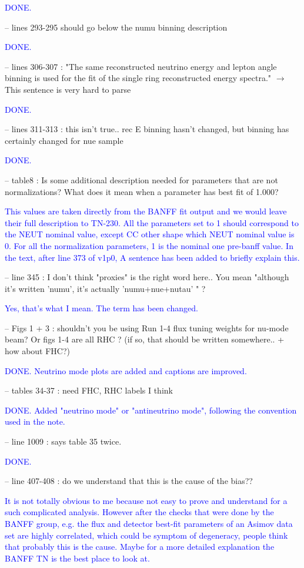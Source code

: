 \documentclass[final]{elsarticle}
\begin{document}
\textcolor{blue}{DONE.}


-- lines 293-295 should go below the numu binning description

\textcolor{blue}{DONE.}

-- lines 306-307 : "The same reconstructed neutrino energy and lepton angle
binning is used for the fit of the single ring reconstructed energy spectra."
$\rightarrow$ This sentence is very hard to parse

\textcolor{blue}{DONE.}

-- lines 311-313 : this isn't true.. rec E binning hasn't changed, but binning
has certainly changed for nue sample

\textcolor{blue}{DONE.}

-- table8 : Is some additional description needed for parameters that are not
normalizations?  What does it mean when a parameter has best fit of 1.000?

\textcolor{blue}{This values are taken directly from the BANFF fit output and we would leave their full description to TN-230.
All the parameters set to 1 should correspond to the NEUT nominal value,
except CC other shape which NEUT nominal value is 0.
For all the normalization parameters, 1 is the nominal one pre-banff value.
In the text, after line 373 of v1p0, A sentence has been added to briefly explain this.}


-- line 345 : I don't think "proxies" is the right word here.. You mean
"although it's written 'numu', it's actually 'numu+nue+nutau' " ?

\textcolor{blue}{Yes, that's what I mean. The term has been changed.}


-- Figs 1 + 3 : shouldn't you be using Run 1-4 flux tuning weights for nu-mode
beam?  Or figs 1-4 are all RHC ?  (if so, that should be written somewhere.. +
how about FHC?)

\textcolor{blue}{DONE. Neutrino mode plots are added and captions are improved.}

-- tables 34-37 : need FHC, RHC labels I think

\textcolor{blue}{DONE. Added "neutrino mode" or "antineutrino mode", following the convention used in the note.}

-- line 1009 : says table 35 twice.

\textcolor{blue}{DONE.}

-- line 407-408 : do we understand that this is the cause of the bias??

\textcolor{blue}{It is not totally obvious to me because not easy to prove and understand for a such complicated analysis. 
However after the checks that were done
by the BANFF group, e.g. the flux and detector best-fit parameters of an Asimov data set are highly correlated, which could be symptom of degeneracy,
people think that probably this is the cause. Maybe for a more detailed explanation the BANFF TN is the best place to look at.   }
\end{document}
